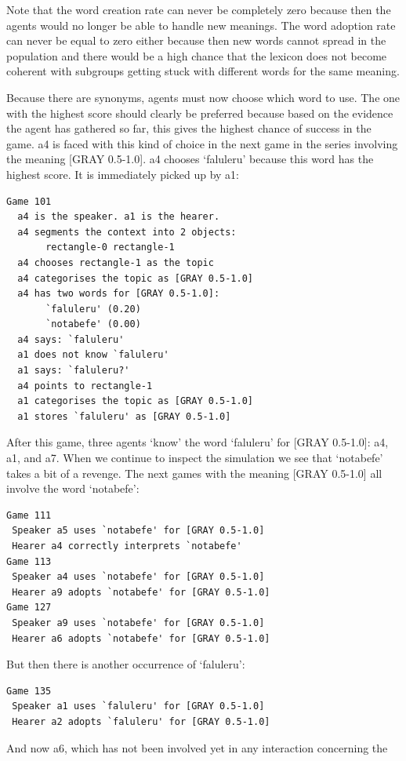 Note that the word creation 
rate can never be completely zero because then the agents
would no longer be able to handle new meanings. The word 
adoption rate can never be equal to zero either because then 
new words cannot spread in the population and there
would be a high chance that the lexicon does not become coherent
with subgroups getting stuck with different
words for the same meaning. 

Because there are synonyms, agents must now choose
which word to use. The one with the highest
score should clearly be preferred because based on the
evidence the agent has gathered so far, this
gives the highest chance of success in the game. {\bfshape  a4}
is faced with this kind of choice in 
the next game in the series involving the meaning
{}[GRAY 0.5-1.0]. {\bfshape  a4} chooses `faluleru' because this 
word has the highest score. It is immediately picked up by 
{\bfshape  a1}: 
\begin{verbatim}
Game 101
  a4 is the speaker. a1 is the hearer. 
  a4 segments the context into 2 objects: 
       rectangle-0 rectangle-1
  a4 chooses rectangle-1 as the topic 
  a4 categorises the topic as [GRAY 0.5-1.0]
  a4 has two words for [GRAY 0.5-1.0]:
       `faluleru' (0.20)
       `notabefe' (0.00)
  a4 says: `faluleru'
  a1 does not know `faluleru'
  a1 says: `faluleru?'
  a4 points to rectangle-1
  a1 categorises the topic as [GRAY 0.5-1.0]
  a1 stores `faluleru' as [GRAY 0.5-1.0]
\end{verbatim}
After this game, three agents `know' the word 
`faluleru' for [GRAY 0.5-1.0]: {\bfshape  a4}, {\bfshape  a1}, 
and {\bfshape  a7}. When we continue to inspect the
simulation we see that `notabefe' takes a bit of 
a revenge. The next games with the 
meaning [GRAY 0.5-1.0] all involve the word `notabefe': 
\begin{verbatim}
Game 111
 Speaker a5 uses `notabefe' for [GRAY 0.5-1.0]
 Hearer a4 correctly interprets `notabefe'
Game 113
 Speaker a4 uses `notabefe' for [GRAY 0.5-1.0]
 Hearer a9 adopts `notabefe' for [GRAY 0.5-1.0]
Game 127
 Speaker a9 uses `notabefe' for [GRAY 0.5-1.0]
 Hearer a6 adopts `notabefe' for [GRAY 0.5-1.0]
\end{verbatim}
But then there is another occurrence of `faluleru': 
\begin{verbatim}
Game 135 
 Speaker a1 uses `faluleru' for [GRAY 0.5-1.0]
 Hearer a2 adopts `faluleru' for [GRAY 0.5-1.0]
\end{verbatim}
And now {\bfshape  a6}, which has not been involved 
yet in any interaction concerning the 
